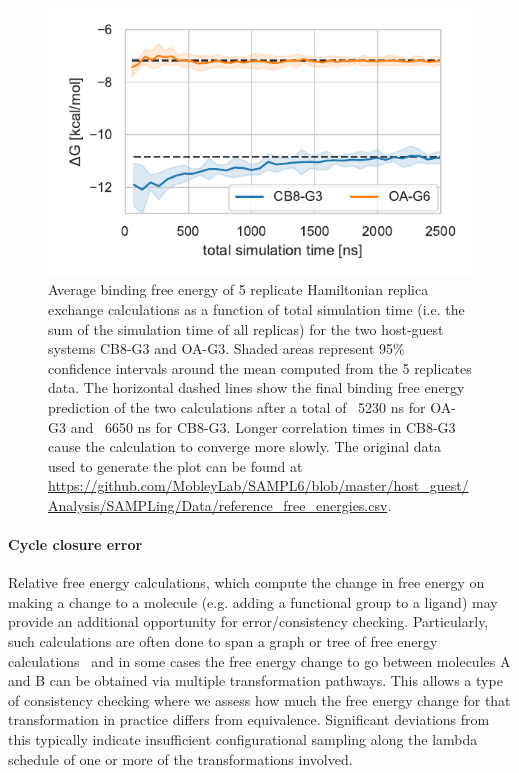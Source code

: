 \documentclass[9pt,bestpractices]{livecoms}
\begin{document}
\begin{figure}
    \includegraphics[width=0.95\linewidth]{figures/fig9_convergence/Figure.pdf}
    \caption{Average binding free energy of 5 replicate Hamiltonian replica exchange calculations as a function of total simulation time (i.e. the sum of the simulation time of all replicas) for the two host-guest systems CB8-G3 and OA-G3. Shaded areas represent 95\% confidence intervals around the mean computed from the 5 replicates data. The horizontal dashed lines show the final binding free energy prediction of the two calculations after a total of ~5230 ns for OA-G3 and ~6650 ns for CB8-G3. Longer correlation times in CB8-G3 cause the calculation to converge more slowly. The original data used to generate the plot can be found at \url{https://github.com/MobleyLab/SAMPL6/blob/master/host_guest/Analysis/SAMPLing/Data/reference_free_energies.csv}.
}
    \label{fig:freeenergytrajectories}
\end{figure}

\paragraph{Cycle closure error}
Relative free energy calculations, which compute the change in free energy on making a change to a molecule (e.g. adding a functional group to a ligand) may provide an additional opportunity for error/consistency checking. Particularly, such calculations are often done to span a graph or tree of free energy calculations~\cite{xu2019diffnet,wang2013modeling,liu2013lead} and in some cases the free energy change to go between molecules A and B can be obtained via multiple transformation pathways. This allows a type of consistency checking where we assess how much the free energy change for that transformation in practice differs from equivalence. Significant deviations from this typically indicate insufficient configurational sampling along the lambda schedule of one or more of the transformations involved.
\end{document}
